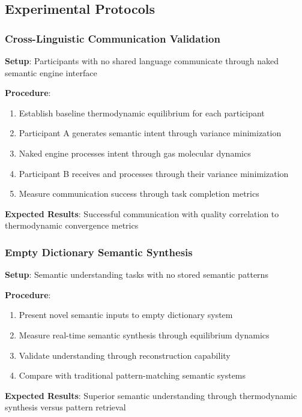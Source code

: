 \documentclass[11pt,a4paper]{article}
\begin{document}
\subsection{Experimental Protocols}

\subsubsection{Cross-Linguistic Communication Validation}

\textbf{Setup}: Participants with no shared language communicate through naked semantic engine interface

\textbf{Procedure}:
\begin{enumerate}
\item Establish baseline thermodynamic equilibrium for each participant
\item Participant A generates semantic intent through variance minimization
\item Naked engine processes intent through gas molecular dynamics
\item Participant B receives and processes through their variance minimization
\item Measure communication success through task completion metrics
\end{enumerate}

\textbf{Expected Results}: Successful communication with quality correlation to thermodynamic convergence metrics

\subsubsection{Empty Dictionary Semantic Synthesis}

\textbf{Setup}: Semantic understanding tasks with no stored semantic patterns

\textbf{Procedure}:
\begin{enumerate}
\item Present novel semantic inputs to empty dictionary system
\item Measure real-time semantic synthesis through equilibrium dynamics
\item Validate understanding through reconstruction capability
\item Compare with traditional pattern-matching semantic systems
\end{enumerate}

\textbf{Expected Results}: Superior semantic understanding through thermodynamic synthesis versus pattern retrieval
\end{document}
